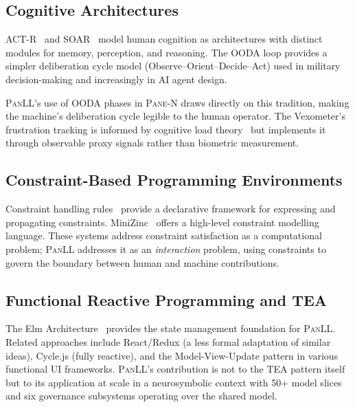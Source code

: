 \documentclass[11pt,a4paper]{article}
\newcommand{\paneN}{\textsc{Pane-N}}
\newcommand{\panll}{\textsc{PanLL}}
\newcommand{\tea}{\textsc{TEA}}
\begin{document}
\subsection{Cognitive Architectures}

ACT-R~\citep{anderson2004integrated} and SOAR~\citep{laird2012soar}
model human cognition as architectures with distinct modules for
memory, perception, and reasoning. The OODA loop
\citep{boyd1996essence} provides a simpler deliberation cycle model
(Observe--Orient--Decide--Act) used in military decision-making
and increasingly in AI agent design.

\panll{}'s use of OODA phases in \paneN{} draws directly on this
tradition, making the machine's deliberation cycle legible to the
human operator. The Vexometer's frustration tracking is informed
by cognitive load theory~\citep{sweller1988cognitive} but implements
it through observable proxy signals rather than biometric measurement.

\subsection{Constraint-Based Programming Environments}

Constraint handling rules~\citep{fruhwirth2009constraint} provide
a declarative framework for expressing and propagating constraints.
MiniZinc~\citep{nethercote2007minizinc} offers a high-level
constraint modelling language. These systems address constraint
satisfaction as a computational problem; \panll{} addresses it as
an \textit{interaction} problem, using constraints to govern the
boundary between human and machine contributions.

\subsection{Functional Reactive Programming and TEA}

The Elm Architecture~\citep{czaplicki2012elm} provides the state
management foundation for \panll{}. Related approaches include
React/Redux (a less formal adaptation of similar ideas), Cycle.js
(fully reactive), and the Model-View-Update pattern in various
functional UI frameworks. \panll{}'s contribution is not to the
\tea{} pattern itself but to its application at scale in a
neurosymbolic context with 50+ model slices and six governance
subsystems operating over the shared model.

\end{document}
